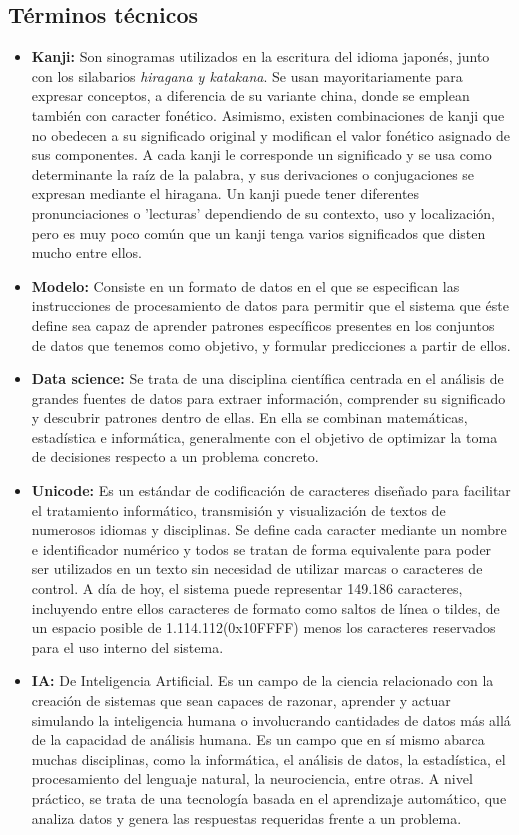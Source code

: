 \documentclass{article}
\begin{document}
\subsection{Términos técnicos}
\label{sec:terms}
\begin{itemize}
	\item \textbf{Kanji:} Son sinogramas utilizados en la escritura del idioma japonés, junto con los silabarios \textit{hiragana y katakana}. Se usan mayoritariamente para expresar conceptos, a diferencia de su variante china, donde se emplean también con caracter fonético. Asimismo, existen combinaciones de kanji  que no obedecen a su significado original y modifican el valor fonético asignado de sus componentes. A cada kanji le corresponde un significado y se usa como determinante la raíz de la palabra, y sus derivaciones o conjugaciones se expresan mediante el hiragana. Un kanji puede tener diferentes pronunciaciones o 'lecturas' dependiendo de su contexto, uso y localización, pero es muy poco común que un kanji tenga varios significados que disten mucho entre ellos.
	\item \textbf{Modelo:} Consiste en un formato de datos en el que se especifican las instrucciones de procesamiento de datos para permitir que el sistema que éste define sea capaz de aprender patrones específicos presentes en los conjuntos de datos que tenemos como objetivo, y formular predicciones a partir de ellos.
	\item \textbf{Data science:} Se trata de una disciplina científica centrada en el análisis de grandes fuentes de datos para extraer información, comprender su significado y descubrir patrones dentro de ellas. En ella se combinan matemáticas, estadística  e informática, generalmente con el objetivo de optimizar la toma de decisiones respecto a un problema concreto.
	\item \textbf{Unicode:} Es un estándar de codificación de caracteres diseñado para facilitar el tratamiento informático, transmisión y visualización de textos de numerosos idiomas y disciplinas. Se define cada caracter mediante un nombre e identificador numérico y todos se tratan de forma equivalente para poder ser utilizados en un texto sin necesidad de utilizar marcas o caracteres de control. A día de hoy, el sistema puede representar 149.186 caracteres, incluyendo entre ellos caracteres de formato como saltos de línea o tildes, de un espacio posible de 1.114.112(0x10FFFF) menos los caracteres reservados para el uso interno del sistema.
	\item \textbf{IA:} De Inteligencia Artificial. Es un campo de la ciencia relacionado con la creación de sistemas que sean capaces de razonar, aprender y actuar simulando la inteligencia humana o involucrando cantidades de datos más allá de la capacidad de análisis humana. Es un campo que en sí mismo abarca muchas disciplinas, como la informática, el análisis de datos, la estadística, el procesamiento del lenguaje natural, la neurociencia, entre otras. A nivel práctico, se trata de una tecnología basada en el aprendizaje automático, que analiza datos y genera las respuestas requeridas frente a un problema.

\end{itemize}
\end{document}
